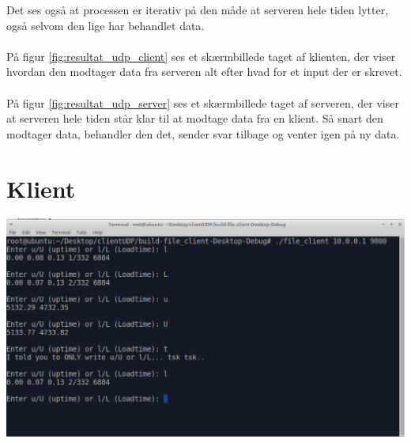 \documentclass[12pt,fleqn,a4paper]{report}
\begin{document}
Det ses også at processen er iterativ på den måde at serveren hele tiden lytter, også selvom den lige har behandlet data.
\\
\\
På figur \ref{fig:resultat_udp_client} ses et skærmbillede taget af klienten, der viser hvordan den modtager data fra serveren alt efter hvad for et input der er skrevet.
\\
\\
På figur \ref{fig:resultat_udp_server} ses et skærmbillede taget af serveren, der viser at serveren hele tiden står klar til at modtage data fra en klient. Så snart den modtager data, behandler den det, sender svar tilbage og venter igen på ny data.

\section{Klient}
\begin{center}
	\includegraphics[width=0.9 \textwidth]{resultat_udp_client.png}
	\label{fig:resultat_udp_client}
\end{center}
\end{document}
